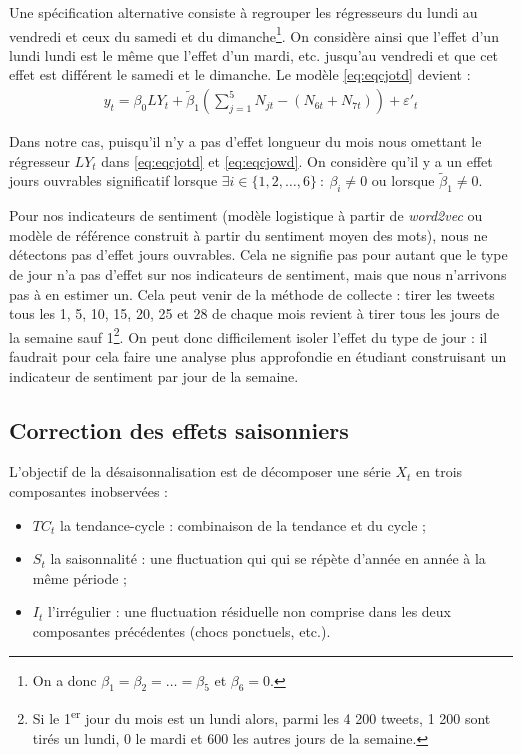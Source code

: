 \documentclass[11pt,french,french]{article}
\let\rmarkdownfootnote\footnote%
\def\footnote{\protect\rmarkdownfootnote}
\begin{document}
Une spécification alternative consiste à regrouper les régresseurs du lundi au vendredi et ceux du samedi et du dimanche\footnote{On a donc \(\beta_1=\beta_2=\dots=\beta_5\) et \(\beta_6 = 0\).}.
On considère ainsi que l'effet d'un lundi lundi est le même que l'effet d'un mardi, etc. jusqu'au vendredi et que cet effet est différent le samedi et le dimanche. Le modèle \eqref{eq:eqcjotd} devient :
\begin{eqnarray}
y_t=\beta_0 LY_t + \tilde\beta_1 \left(\sum_{j=1}^{5}N_{jt} - (N_{6t} + N_{7t})\right) + \varepsilon'_t
\label{eq:eqcjowd}
\end{eqnarray}

Dans notre cas, puisqu'il n'y a pas d'effet longueur du mois nous omettant le régresseur \(LY_t\) dans \eqref{eq:eqcjotd} et \eqref{eq:eqcjowd}. On considère qu'il y a un effet jours ouvrables significatif lorsque \(\exists i\in \{1,2,\dots,6\}\::\:\beta_i\ne0\) ou lorsque \(\tilde\beta_1\ne0\).

Pour nos indicateurs de sentiment (modèle logistique à partir de \emph{word2vec} ou modèle de référence construit à partir du sentiment moyen des mots), nous ne détectons pas d'effet jours ouvrables.
Cela ne signifie pas pour autant que le type de jour n'a pas d'effet sur nos indicateurs de sentiment, mais que nous n'arrivons pas à en estimer un.
Cela peut venir de la méthode de collecte : tirer les tweets tous les 1, 5, 10, 15, 20, 25 et 28 de chaque mois revient à tirer tous les jours de la semaine sauf 1\footnote{Si le 1\textsuperscript{er} jour du mois est un lundi alors, parmi les 4 200 tweets, 1 200 sont tirés un lundi, 0 le mardi et 600 les autres jours de la semaine.}.
On peut donc difficilement isoler l'effet du type de jour : il faudrait pour cela faire une analyse plus approfondie en étudiant construisant un indicateur de sentiment par jour de la semaine.

\hypertarget{sec:cvs}{%
\subsection{Correction des effets saisonniers}\label{sec:cvs}}

L'objectif de la désaisonnalisation est de décomposer une série \(X_t\) en trois composantes inobservées :

\begin{itemize}
\item
  \(TC_t\) la tendance-cycle : combinaison de la tendance et du cycle ;
\item
  \(S_t\) la saisonnalité : une fluctuation qui qui se répète d'année en année à la même période ;
\item
  \(I_t\) l'irrégulier : une fluctuation résiduelle non comprise dans les deux composantes précédentes (chocs ponctuels, etc.).
\end{itemize}
\end{document}
